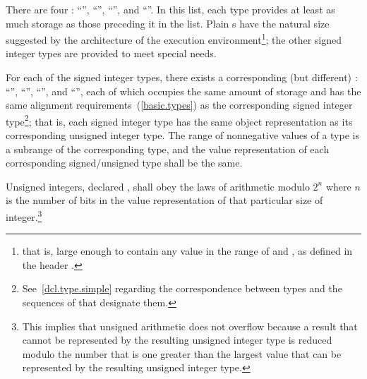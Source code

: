 \pnum
{}%
%
There are four  :
%
%
%
%
``'', ``'', ``'', and
``''. In
this list, each type provides at least as much storage as those
preceding it in the list.
%
Plain
s have the natural size suggested by the architecture of the
execution environment\footnote{that is, large enough to contain any value in the range of
 and , as defined in the header
.};
the other signed integer types are provided to meet special needs.

\pnum
{}%
For each of the signed integer types,
there exists a corresponding (but different)
%
%
:
%
%
%
%
``'', ``'',
``'', and ``'', each of
which occupies the same amount of storage and has the same alignment
requirements~(\ref{basic.types}) as the corresponding signed integer
type\footnote{See~\ref{dcl.type.simple} regarding the correspondence between types and
the sequences of  that designate them.};
that is, each signed integer type has the same object representation as
its corresponding unsigned integer type. The range of nonnegative
values of a  type is a subrange of the corresponding
 type, and the value
representation of each corresponding signed/unsigned type shall be the
same.

\pnum
{}%
Unsigned integers, declared , shall obey the laws of
arithmetic modulo $2^n$ where $n$ is the number of bits in the value
representation of that particular size of integer.\footnote{This implies that
unsigned arithmetic does not overflow because a result
that cannot be represented by the resulting unsigned integer type is
reduced modulo the number that is one greater than the largest value
that can be represented by the resulting unsigned integer type.}

